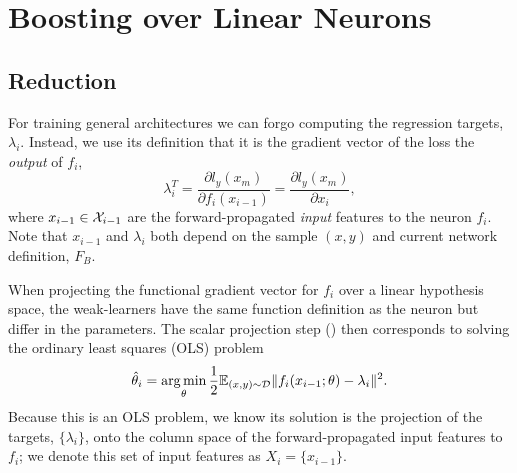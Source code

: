 \section{Boosting over Linear Neurons}
\label{sec:lnb}

\subsection{Reduction}
For training general architectures we can forgo computing the 
regression targets, $\lambda_i$. Instead, we use
its definition that it is the gradient vector of the loss
\wrt the \emph{output} of $f_i$,
%
\begin{equation}
\label{eq:lambda}
\lambda_i^T
= \frac{\partial l_{y}(x_m)}{\partial f_i(x_{i-1})}
= \frac{\partial l_{y}(x_m)}{\partial x_i},
\end{equation}
%
where $x_{i-1} \in {\mathcal{X}}_{i-1}$ are the forward-propagated \emph{input} features to the neuron $f_i$.
Note that $x_{i-1}$ and $\lambda_i$ both depend on the sample $(x,y)$ and current
network definition, $F_B$.

When projecting the functional gradient vector for $f_i$
over a linear hypothesis space, the weak-learners have the same
function definition as the neuron but differ in the parameters.
The scalar projection step () then corresponds to
solving the ordinary least squares (OLS) problem
%
\begin{equation}
\label{eq:OLS}
\hat{\theta}_i = \operatorname*{arg\,min}_{\theta} \frac{1}{2} \mathbb{E}_{(x,y) \sim {\mathcal{D}}} 
\Vert f_i(x_{i-1};\theta) - \lambda_i \Vert^2.
\end{equation}
%
Because this is an OLS problem, we know its solution
is the projection of the targets, $\{\lambda_i\}$,
onto the column space of the forward-propagated input features to $f_i$;
we denote this set of input features as $X_i = \{x_{i-1}\}$.

